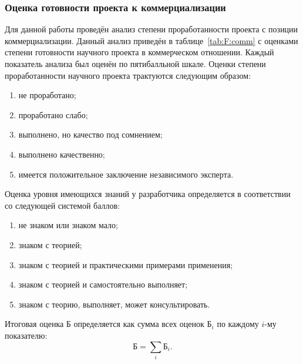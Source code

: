 \subsubsection{Оценка готовности проекта к коммерциализации}
\label{F:comm}

Для данной работы проведён анализ степени проработанности проекта с позиции коммерциализации.
Данный анализ приведён в таблице~\ref{tab:F:comm} с оценками степени готовности научного проекта в коммерческом отношении.
Каждый показатель анализа был оценён по пятибалльной шкале. 
Оценки степени проработанности научного проекта трактуются следующим образом:

\begin{enumerate}[label=\arabic* --]
    \item не проработано;
    \item проработано слабо;
    \item выполнено, но качество под сомнением;
    \item выполнено качественно;
    \item имеется положительное заключение независимого эксперта.
\end{enumerate}

Оценка уровня имеющихся знаний у разработчика определяется в соответствии со следующей системой баллов:

\begin{enumerate}[label=\arabic* --]
    \item не знаком или знаком мало;
    \item знаком с теорией;
    \item знаком с теорией и практическими примерами применения;
    \item знаком с теорией и самостоятельно выполняет;
    \item знаком с теорию, выполняет, может консультировать.
\end{enumerate}

Итоговая оценка Б определяется как сумма всех оценок $\text{Б}_i$ по каждому $i$-му показателю:
\begin{equation}
    \text{Б} = \sum_i \text{Б}_i.
\end{equation}

